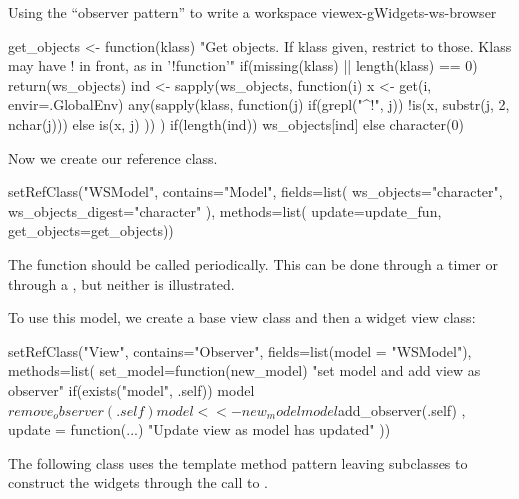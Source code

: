 \begin{example}{Using the ``observer pattern'' to write a workspace view}{ex-gWidgets-ws-browser}
\begin{Schunk}
\begin{Sinput}
 get_objects <- function(klass) {
   "Get objects. If klass given, restrict to those. 
 Klass may have ! in front, as in '!function'"
   if(missing(klass) || length(klass) == 0)
     return(ws_objects)
   ind <- sapply(ws_objects, function(i) {
     x <- get(i, envir=.GlobalEnv)
     any(sapply(klass, function(j)  {
       if(grepl("^!", j))
         !is(x, substr(j, 2, nchar(j)))
       else
         is(x, j)
     }))
   })
   if(length(ind))
     ws_objects[ind]
   else
     character(0)
 }
\end{Sinput}
\end{Schunk}
%

Now we create our reference class.
\begin{Schunk}
\begin{Sinput}
 setRefClass("WSModel",
             contains="Model",
             fields=list(
               ws_objects="character",
               ws_objects_digest="character"
               ),
             methods=list(
               update=update_fun,
               get_objects=get_objects))
\end{Sinput}
\end{Schunk}
%
The  function should be called periodically. This can be
done through a timer or through a , but neither is illustrated.



To use this model, we create a base view class and then a widget view class:

\begin{Schunk}
\begin{Sinput}
 setRefClass("View",
             contains="Observer",
             fields=list(model = "WSModel"),
             methods=list(
               set_model=function(new_model) {
                 "set model and add view as observer"
                 if(exists("model", .self)) 
                   model$remove_observer(.self)
                 model <<- new_model
                 model$add_observer(.self)
               },
               update = function(...) {
                 "Update view as model has updated"
               }))
\end{Sinput}
\end{Schunk}
%

The following  class uses the template method
pattern leaving subclasses to construct the widgets through the call
to . 


\end{example}
